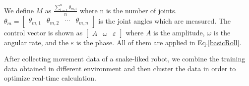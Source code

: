 We define $M$ as $\frac{\sum_{i=1}^{n}\theta_{m,i}}{n} $ where n is the number of joints. $\theta_{m}=\begin{bmatrix}
\theta_{m,1} & \theta_{m,2} & \cdots & \theta_{m,n}
\end{bmatrix}$ is the joint angles which are measured. The control vector is shown as
$\begin{bmatrix}
A& \omega&\varepsilon
\end{bmatrix}$
where $A$ is the amplitude, $\omega$ is the angular rate, and the $\varepsilon$ is the phase. All of them are applied in Eq.\ref{basicRoll}.

After collecting movement data of a snake-liked robot, we combine the training data obtained in different environment and then cluster the data in order to optimize real-time calculation.

